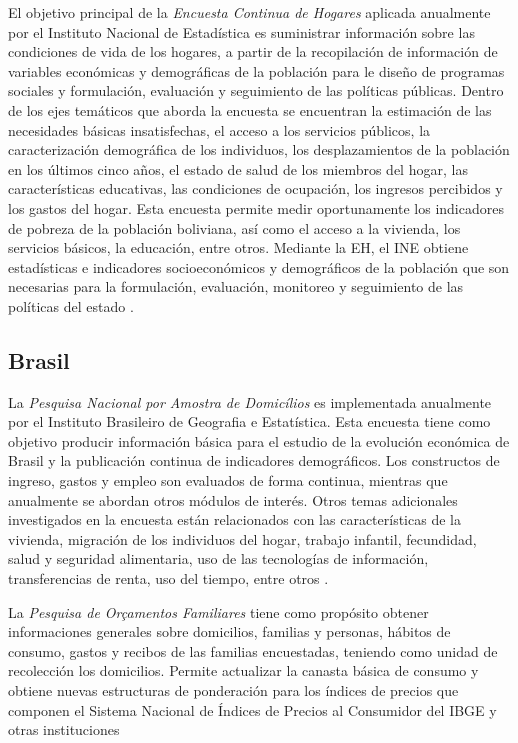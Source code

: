 \documentclass[12pt,spanish,]{book}
\begin{document}
El objetivo principal de la \emph{Encuesta Continua de Hogares} aplicada anualmente por el Instituto Nacional de Estadística es suministrar información sobre las condiciones de vida de los hogares, a partir de la recopilación de información de variables económicas y demográficas de la población para le diseño de programas sociales y formulación, evaluación y seguimiento de las políticas públicas. Dentro de los ejes temáticos que aborda la encuesta se encuentran la estimación de las necesidades básicas insatisfechas, el acceso a los servicios públicos, la caracterización demográfica de los individuos, los desplazamientos de la población en los últimos cinco años, el estado de salud de los miembros del hogar, las características educativas, las condiciones de ocupación, los ingresos percibidos y los gastos del hogar. Esta encuesta permite medir oportunamente los indicadores de pobreza de la población boliviana, así como el acceso a la vivienda, los servicios básicos, la educación, entre otros. Mediante la EH, el INE obtiene estadísticas e indicadores socioeconómicos y demográficos de la población que son necesarias para la formulación, evaluación, monitoreo y seguimiento de las políticas del estado \autocite{INE-BO}.

\hypertarget{brasil}{%
\subsection*{Brasil}\label{brasil}}

La \emph{Pesquisa Nacional por Amostra de Domicílios} es implementada anualmente por el Instituto Brasileiro de Geografia e Estatística. Esta encuesta tiene como objetivo producir información básica para el estudio de la evolución económica de Brasil y la publicación continua de indicadores demográficos. Los constructos de ingreso, gastos y empleo son evaluados de forma continua, mientras que anualmente se abordan otros módulos de interés. Otros temas adicionales investigados en la encuesta están relacionados con las características de la vivienda, migración de los individuos del hogar, trabajo infantil, fecundidad, salud y seguridad alimentaria, uso de las tecnologías de información, transferencias de renta, uso del tiempo, entre otros \autocite{IBGE-BR_2017}.

La \emph{Pesquisa de Orçamentos Familiares} tiene como propósito obtener informaciones generales sobre domicilios, familias y personas, hábitos de consumo, gastos y recibos de las familias encuestadas, teniendo como unidad de recolección los domicilios. Permite actualizar la canasta básica de consumo y obtiene nuevas estructuras de ponderación para los índices de precios que componen el Sistema Nacional de Índices de Precios al Consumidor del IBGE y otras instituciones \autocite{IBGE-BR2018}
\end{document}
